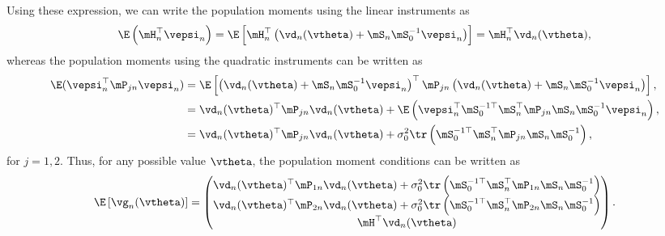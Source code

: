 \documentclass[english,12pt]{book}\usepackage[]{graphicx}\usepackage[]{xcolor}
\begin{document}
Using these expression, we can write the population moments using the linear instruments as
\begin{equation*}
\E\left(\mH_n^\top\vepsi_n\right) = \E\left[\mH_n^\top\left(\vd_n(\vtheta) + \mS_n\mS_0^{-1}\vepsi_n\right)\right] = \mH^\top_n\vd_n(\vtheta), 
\end{equation*}
%
whereas the population moments using the quadratic instruments can be written as
\begin{equation*}
  \begin{aligned}
   \E(\vepsi_n^\top \mP_{jn}\vepsi_n) & = \E\left[\left(\vd_n(\vtheta) + \mS_n\mS_0^{-1}\vepsi_n\right)^\top\mP_{jn}\left(\vd_n(\vtheta) + \mS_n\mS_0^{-1}\vepsi_n\right)\right], \\
   & = \vd_n(\vtheta)^\top\mP_{jn}\vd_n(\vtheta) +\E\left(\vepsi_n^\top\mS_0^{-1\top}\mS_n^\top\mP_{jn}\mS_n\mS_0^{-1}\vepsi_n\right), \\
   & =  \vd_n(\vtheta)^\top\mP_{jn}\vd_n(\vtheta) + \sigma_0^2\tr\left(\mS_0^{-1\top}\mS_n^\top\mP_{jn}\mS_n\mS_0^{-1}\right), 
  \end{aligned}
\end{equation*}
%
for $j = 1, 2$. Thus, for any possible value $\vtheta$, the population moment conditions can be written as
\begin{equation*}
\E\left[\vg_n(\vtheta)\right]  = \begin{pmatrix}
 \vd_n(\vtheta)^\top\mP_{1n}\vd_n(\vtheta) + \sigma_0^2\tr\left(\mS_0^{-1\top}\mS_n^\top\mP_{1n}\mS_n\mS_0^{-1}\right) \\
  \vd_n(\vtheta)^\top\mP_{2n}\vd_n(\vtheta) + \sigma_0^2\tr\left(\mS_0^{-1\top}\mS_n^\top\mP_{2n}\mS_n\mS_0^{-1}\right) \\
  \mH^\top\vd_n(\vtheta)
                       \end{pmatrix}.  
\end{equation*}
\end{document}
